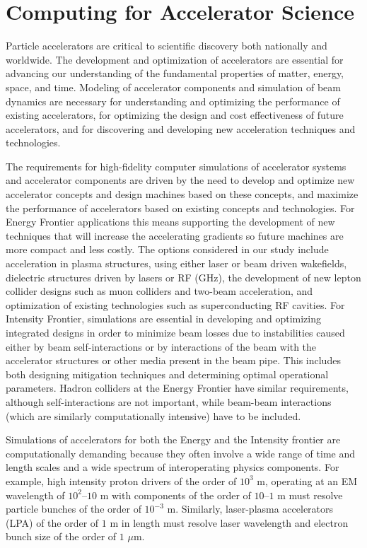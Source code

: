  
\section{Computing for Accelerator Science}

Particle accelerators are critical to scientific discovery both nationally and worldwide. The development and optimization of accelerators are essential for advancing our understanding of the fundamental properties of matter, energy, space, and time. Modeling of accelerator components and simulation of beam dynamics are necessary for understanding and optimizing the performance of existing accelerators, for optimizing the design and cost effectiveness of future accelerators, and for discovering and developing new acceleration techniques and technologies.

The requirements for high-fidelity computer simulations of accelerator systems and accelerator components are driven by the need to develop and optimize new accelerator concepts and design machines based on these concepts, and maximize the performance of accelerators based on existing concepts and technologies.  For  Energy Frontier applications this means supporting the development of new techniques that will increase the accelerating gradients so future machines are more compact and less costly. The options considered in our study include acceleration in plasma structures, using either laser or beam driven wakefields, dielectric structures driven by lasers or RF (GHz), the development of new lepton collider designs such as muon colliders and two-beam acceleration, and optimization of existing technologies such as superconducting RF cavities. For  Intensity Frontier, simulations are essential in developing and optimizing integrated designs in order to minimize beam losses due to instabilities caused either by beam self-interactions or by interactions of the beam with the accelerator structures or other media present in the beam pipe.  This  includes both designing mitigation techniques and determining optimal operational parameters.  Hadron colliders at the Energy Frontier have similar requirements, although self-interactions are not important, while beam-beam interactions (which are similarly computationally intensive) have to be included.  

Simulations of accelerators for both the Energy and the Intensity frontier are computationally demanding because they often involve a wide range of time and length scales and a wide spectrum of interoperating physics components. For example, high intensity proton drivers of the order of $10^3$ m, operating at an EM wavelength of $10^2$--$10$ m with components of the order of $10$--$1$ m must resolve particle bunches of the order of $10^{-3}$ m. Similarly, laser-plasma accelerators (LPA) of the order of $1$ m in length must resolve laser wavelength and electron bunch size of the order of $1$ $\mu$m.

